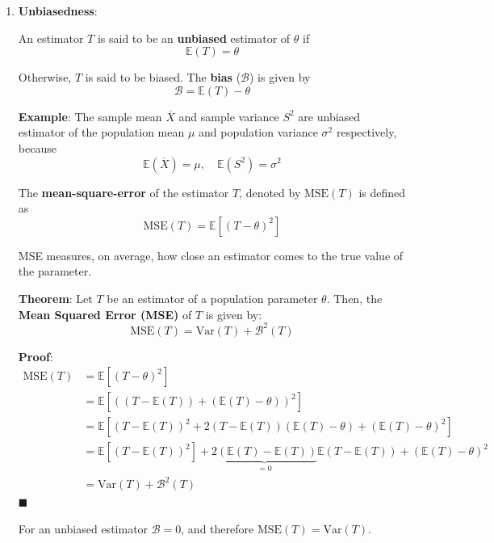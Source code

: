 \documentclass[twoside]{book}
\begin{document}
\begin{enumerate}
    \item \textbf{Unbiasedness}: 
    \begin{textbox}
    An estimator \( T \) is said to be an \textbf{unbiased} estimator of $\theta$ if
    \[
        \mathbb{E}(T) = \theta
        \]
    \end{textbox}
    Otherwise, $T$ is said to be biased. The \textbf{bias} ($\mathcal{B}$) is given by
    $$\mathcal{B} = \mathbb{E}(T) - \theta$$
    
    \textbf{Example}: The sample mean $\overline{X}$ and sample variance $S^2$ are unbiased estimator of the population mean $\mu$ and population variance $\sigma^2$ respectively, because
    $$\mathbb{E}\left( \overline{X}\right) = \mu, \quad \mathbb{E}\left( S^2\right) = \sigma^2$$
    
    \begin{textbox}
    The \textbf{mean-square-error} of the estimator $T$, denoted by $\textrm{MSE}(T)$ is defined as
        $$\mathrm{MSE}(T) = \mathbb{E}\left[\left( T-\theta\right) ^2\right]$$
    \end{textbox}
    
    MSE measures, on average, how close an estimator comes to the true value of the parameter.
    
    \begin{textbox}
    \textbf{Theorem}: Let \( T \) be an estimator of a population parameter \( \theta \). Then, the \textbf{Mean Squared Error (MSE)} of \( T \) is given by:
    \[
    \mathrm{MSE}(T) = \mathrm{Var}(T) + \mathcal{B}^2(T)
    \]
    \end{textbox}
    \textbf{Proof}:
    \begin{align*}
    \mathrm{MSE}(T) &= \mathbb{E}\left[(T - \theta)^2\right] \\
    &= \mathbb{E}\left[\left((T - \mathbb{E}(T)) + (\mathbb{E}(T) - \theta)\right)^2\right] \\
    &= \mathbb{E}\left[(T - \mathbb{E}(T))^2 + 2(T - \mathbb{E}(T))(\mathbb{E}(T) - \theta) + (\mathbb{E}(T) - \theta)^2\right] \\
    &= \mathbb{E}[(T - \mathbb{E}(T))^2] + \underbrace{2(\mathbb{E}(T) - \mathbb{E}(T))}_{= 0}\mathbb{E}\left( T - \mathbb{E}(T)\right)  + (\mathbb{E}(T) - \theta)^2 \\
    &= \mathrm{Var}(T) + \mathcal{B}^2(T)
    \end{align*}
    \hfill $\blacksquare$
    
    For an unbiased estimator $\mathcal{B} = 0$, and therefore $\mathrm{MSE}(T) = \mathrm{Var}(T)$.


\end{enumerate}
\end{document}
